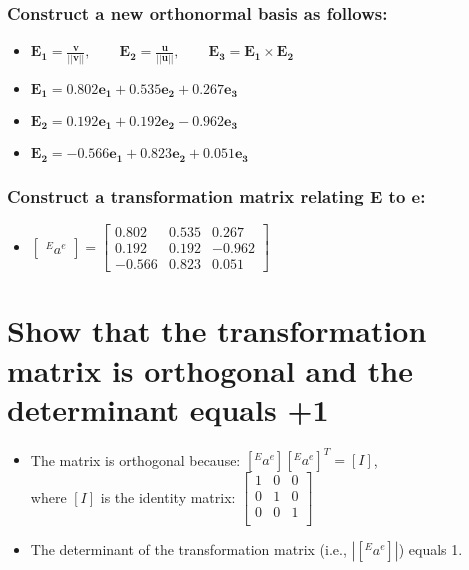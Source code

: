 \documentclass[10pt, letterpaper]{article}
\begin{document}
	\subsubsection{Construct a new orthonormal basis  as follows:}
		\begin{itemize}
			\item $\boldsymbol{E_1} = \boldsymbol{\frac{v}{||v||}}, \qquad \boldsymbol{E_2} = \boldsymbol{\frac{u}{||u||}},
								 \qquad \boldsymbol{E_3} = \boldsymbol{E_1} \times \boldsymbol{E_2}$
			\item $\boldsymbol{E_1} = 0.802 \boldsymbol{e_1} + 0.535 \boldsymbol{e_2} + 0.267 \boldsymbol{e_3}$
			\item $\boldsymbol{E_2} = 0.192 \boldsymbol{e_1} + 0.192 \boldsymbol{e_2} -0.962 \boldsymbol{e_3}$					\item $\boldsymbol{E_2} = -0.566 \boldsymbol{e_1} + 0.823 \boldsymbol{e_2} + 0.051 \boldsymbol{e_3}$			
		\end{itemize}
		
	\subsubsection{Construct a transformation matrix relating $\boldsymbol{E}$ to $\boldsymbol{e}$:}
		\begin{itemize}
			\item $\begin{bmatrix} {}^E a^e \end{bmatrix} = \begin{bmatrix}
				0.802 & 0.535 & 0.267 \\
				0.192 & 0.192 & -0.962 \\
				-0.566 & 0.823 & 0.051
				\end{bmatrix}$
		\end{itemize}

\section{Show that the transformation matrix is orthogonal and the determinant equals +1}
	\begin{itemize} 
		\item The matrix is orthogonal because: $[{}^E a^e] [{}^E a^e]^T = [I]$,\\
			 where $[I]$ is the identity matrix: $\begin{bmatrix} 	1 & 0 & 0 \\
			 										0 & 1 & 0 \\
													0 & 0 & 1 \\
													\end{bmatrix}$
													
		\item The determinant of the transformation matrix (i.e., $|[{}^E a^e]|$) equals 1.
	\end{itemize}
\end{document}
